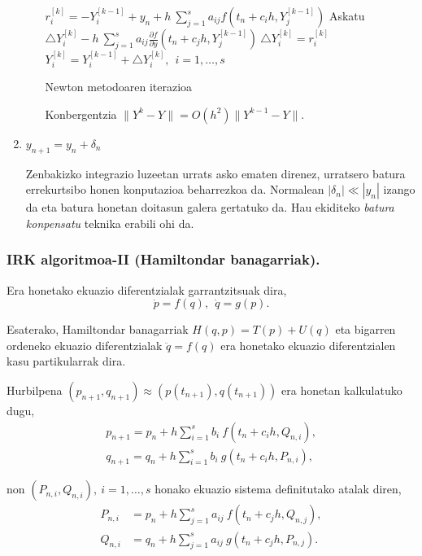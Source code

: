 \begin{enumerate}
\begin{enumerate}
\begin{algorithm}[H]
  {
   $r_{i}^{[k]}=-Y_i^{[k-1]}+y_n+h \ \sum\limits_{j=1}^{s} a_{ij} f(t_n+c_ih,Y_j^{[k-1]}) $\;
   Askatu $\triangle Y_i^{[k]}-h \ \sum\limits_{j=1}^{s} a_{ij} \frac{\partial f}{\partial y}(t_n+c_jh,Y_j^{[k-1]}) \ \triangle Y_i^{[k]}=r_i^{[k]}$\;
   $Y_i^{[k]}=Y_i^{[k-1]}+\triangle Y_i^{[k]}, \ \  i=1,\dots,s$\; 
  }
 \caption{Newton metodoaren iterazioa}
\end{algorithm}

Konbergentzia $\|Y^k-Y\|=O(h^2) \|Y^{k-1}-Y\|$.


\end{enumerate}


\item $y_{n+1}=y_{n}+ \delta_n $\;

Zenbakizko integrazio luzeetan urrats asko ematen direnez, urratsero batura errekurtsibo honen konputazioa beharrezkoa da. Normalean $|\delta_n|\ll |y_n| $ izango da eta batura honetan doitasun galera gertatuko da. Hau ekiditeko \emph{batura konpensatu} teknika erabili ohi da.

\end{enumerate} 

\subsubsection*{IRK algoritmoa-II (Hamiltondar banagarriak).}

Era honetako ekuazio diferentzialak garrantzitsuak dira,
\begin{equation*}
\dot{p}=f(q), \ \ \dot{q}=g(p).
\end{equation*}

Esaterako, Hamiltondar banagarriak $H(q,p)=T(p)+U(q)$ eta bigarren ordeneko ekuazio diferentzialak $\ddot{q}=f(q)$ era honetako ekuazio diferentzialen kasu partikularrak dira.

Hurbilpena $(p_{n+1},q_{n+1}) \approx (p(t_{n+1}),q(t_{n+1}))$ era honetan kalkulatuko dugu,
\begin{align*}
p_{n+1}=p_n+ h \sum\limits_{i=1}^{s} b_i \ f(t_n+c_ih,Q_{n,i}),\\
q_{n+1}=q_n+ h \sum\limits_{i=1}^{s} b_i \ g(t_n+c_ih,P_{n,i}),
\end{align*}

non $(P_{n,i},Q_{n,i}), \ i=1,\dots,s$ honako ekuazio sistema definitutako atalak diren, 
\begin{align*}
P_{n,i} &=p_n+ h \sum\limits_{j=1}^{s} a_{ij} \ f(t_n+c_jh,Q_{n,j}), \\
Q_{n,i} &=q_n+ h \sum\limits_{j=1}^{s} a_{ij} \ g(t_n+c_jh,P_{n,j}).
\end{align*}

